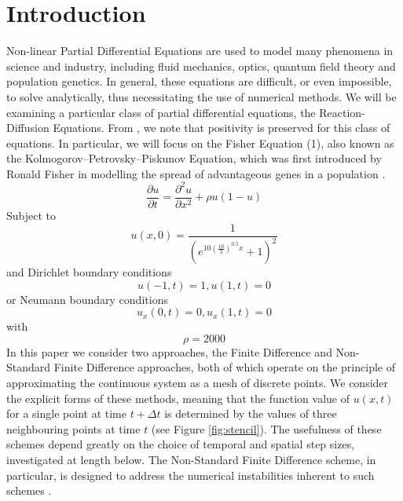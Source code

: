 \documentclass[a4paper]{article}
\begin{document}
\section{Introduction}\label{sec:introduction}
Non-linear Partial Differential Equations are used to model many phenomena in science and industry, including fluid mechanics, optics, quantum field theory and population genetics. In general, these equations are difficult, or even impossible, to solve analytically, thus necessitating the use of numerical methods.
\newline
We will be examining a particular class of partial differential equations, the Reaction-Diffusion Equations. From \cite{mickens}, we note that positivity is preserved for this class of equations. In particular, we will focus on the Fisher Equation (1), also known as the Kolmogorov–Petrovsky–Piskunov Equation, which was first introduced by Ronald Fisher in modelling the spread of advantageous genes in a population \cite{fisher}.
\begin{equation}\label{eq:fisher}
    \frac{\partial u}{\partial t} = \frac{\partial^2 u}{\partial x^2} + \rho u(1-u)
\end{equation}
Subject to
\begin{equation*}
    u(x,0) = \frac{1}{(e^{10(\frac{10}{3})^{0.5} x} + 1)^2}
\end{equation*}
and Dirichlet boundary conditions 
\begin{equation*}
    u(-1,t) = 1 ,
    u(1,t) = 0
\end{equation*}
or Neumann boundary conditions
\begin{equation*}
    u_{x}(0,t) = 0 ,    u_{x}(1,t) = 0
\end{equation*}
with 
\begin{equation*}
    \rho = 2000
\end{equation*}
\newline
In this paper we consider two approaches, the Finite Difference and Non-Standard Finite Difference approaches, both of which operate on the principle of approximating the continuous system as a mesh of discrete points. We consider the explicit forms of these methods, meaning that the function value of $u(x,t)$ for a single point at time $t+\Delta t$ is determined by the values of three neighbouring points at time $t$ (see Figure \ref{fig:stencil}). The usefulness of these schemes depend greatly on the choice of temporal and spatial step sizes, investigated at length below. The Non-Standard Finite Difference scheme, in particular, is designed to address the numerical instabilities inherent to such schemes \cite{mickens,mickens2}.
\end{document}
